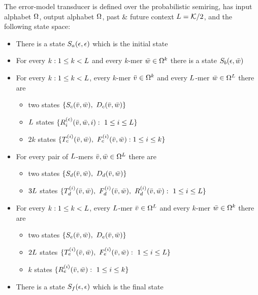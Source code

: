 \documentclass[english]{article}
\begin{document}
The error-model transducer is defined over the probabilistic semiring,
has input alphabet $\Omega$,
output alphabet $\Omega$,
past \& future context $L={\cal K}/2$,
and the following state space:
\begin{itemize}
\item There is a state ${S}_{a}(\epsilon,\epsilon)$ which is the initial state
\item For every $k:1 \leq k < L$ and every $k$-mer $\bar{w} \in \Omega^k$
  there is a state ${S}_{b}(\epsilon,\bar{w})$
\item For every $k:1 \leq k < L$, every $k$-mer $\bar{v} \in \Omega^k$ and every $L$-mer $\bar{w} \in \Omega^L$
  there are
  \begin{itemize}
  \item two states $\{ {S}_{c}(\bar{v},\bar{w}),\ {D}_{c}(\bar{v},\bar{w}) \}$
  \item $L$ states $\{ {R}_{i}^{(c)}(\bar{v},\bar{w},i):\ 1 \leq i \leq L \}$
  \item $2k$ states $\{ {T}_{c}^{(i)}(\bar{v},\bar{w}),\ {F}_{c}^{(i)}(\bar{v},\bar{w}): 1 \leq i \leq k \}$
  \end{itemize}
\item For every pair of $L$-mers $\bar{v}, \bar{w} \in \Omega^L$
  there are
  \begin{itemize}
  \item two states $\{ {S}_{d}(\bar{v},\bar{w}),\ {D}_{d}(\bar{v},\bar{w}) \}$
  \item $3L$ states $\{ \tanstate{d}{i}(\seqpast,\seqnext),\ \fwdstate{d}{i}(\seqpast,\seqnext),\ \revstate{d}{i}(\seqpast,\seqnext):\ 1 \leq i \leq \contextlen \}$
  \end{itemize}
\item For every $k:1 \leq k < L$, every $L$-mer $\bar{v} \in \Omega^L$ and every $k$-mer $\bar{w} \in \Omega^k$
  there are
  \begin{itemize}
  \item two states $\{ {S}_{e}(\bar{v},\bar{w}),\ {D}_{e}(\bar{v},\bar{w}) \}$
  \item $2L$ states $\{ \tanstate{e}{i}(\seqpast,\seqnext),\ \fwdstate{e}{i}(\seqpast,\seqnext):\ 1 \leq i \leq \contextlen \}$
  \item $k$ states $\{ {R}_{e}^{(i)}(\bar{v},\bar{w}):\ 1 \leq i \leq k \}$
  \end{itemize}
\item There is a state ${S}_{f}(\epsilon,\epsilon)$ which is the final state
\end{itemize}
\end{document}
